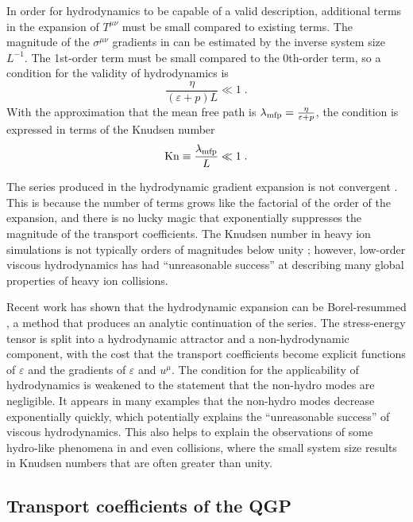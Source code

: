 In order for hydrodynamics to be capable of a valid description, additional terms in the expansion of $T^{\mu\nu}$ must be small compared to existing terms.
The magnitude of the $\sigma^{\mu\nu}$ gradients in  can be estimated by the inverse system size $L^{-1}$.
The 1st-order term must be small compared to the 0th-order term, so a condition for the validity of hydrodynamics is %
\begin{equation}
  \frac{\eta}{(\varepsilon + p)L} \ll 1 \;.
\end{equation}
With the approximation that the mean free path is \(\lambda_\textrm{mfp} = \frac{\eta}{\varepsilon + p} \), the condition is expressed in terms of the Knudsen number
\begin{equation}
  \mathrm{Kn} \equiv \frac{\lambda_\textrm{mfp}}{L} \ll 1 \;.
\end{equation}

The series produced in the hydrodynamic gradient expansion is not convergent \cite{Denicol:2016bjh}.
This is because the number of terms grows like the factorial of the order of the expansion, and there is no lucky magic that exponentially suppresses the magnitude of the transport coefficients.
The Knudsen number in heavy ion simulations is not typically orders of magnitudes below unity \cite{Niemi:2014wta}; however, low-order viscous hydrodynamics has had ``unreasonable success'' at describing many global properties of heavy ion collisions.

Recent work has shown that the hydrodynamic expansion can be Borel-resummed \cite{Romatschke:2016hle,Romatschke:2017vte}, a method that produces an analytic continuation of the series.
The stress-energy tensor is split into a hydrodynamic attractor and a non-hydrodynamic component, with the cost that the transport coefficients become explicit functions of $\varepsilon$ and the gradients of $\varepsilon$ and $u^\mu$.
The condition for the applicability of hydrodynamics is weakened to the statement that the non-hydro modes are negligible.
It appears in many examples that the non-hydro modes decrease exponentially quickly, which potentially explains the ``unreasonable success'' of viscous hydrodynamics.
This also helps to explain the observations of some hydro-like phenomena in \pPb and even \pp collisions, where the small system size results in Knudsen numbers that are often greater than unity.


\subsection{Transport coefficients of the QGP} %

